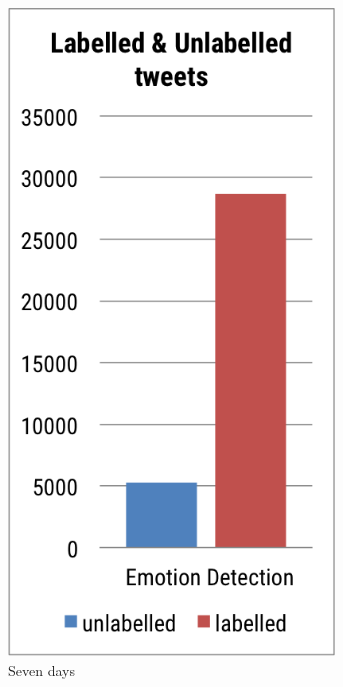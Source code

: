 \begin{figure}[htb!] 
\centering 
\begin{subfigure}{0.24\textwidth}
\centering    
\includegraphics[width=0.95\textwidth]{EmotionLabel}
\caption{Seven days}
\label{fig:emotionLabel}
\end{subfigure}%
\begin{subfigure}{0.38\textwidth}

\end{subfigure}
\end{figure}
